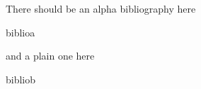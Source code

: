 \documentclass{article}
\begin{document}
There should be an alpha bibliography here

\begin{btSect}{biblioa}
  \btPrintAll
\end{btSect}
and a plain one here

\begin{btSect}{bibliob}
  \btPrintAll
\end{btSect}
\end{document}
